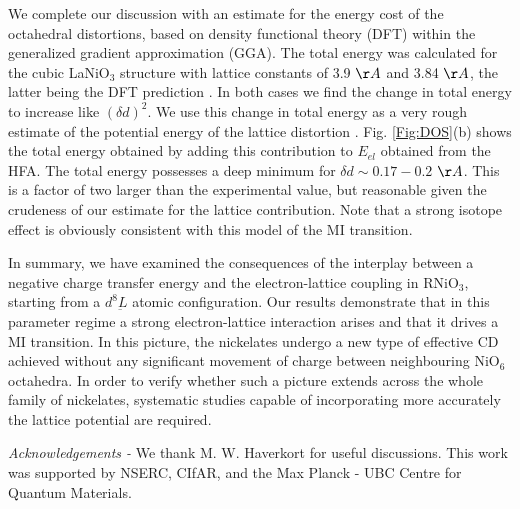 \documentclass[showpacs,preprintnumbers,amsmath,amssymb,prl,aps,twocolumn,superscriptaddress]{revtex4}
\newcommand{\ligand}{{\underbar L}}
\begin{document}
We complete our discussion with an estimate for the energy cost of the
octahedral distortions, based on density functional theory (DFT)
within the generalized gradient approximation (GGA)\cite{gga_PBE,wien2k}. The
total energy was calculated for the cubic LaNiO$_3$ structure with
lattice constants of 3.9 $\AA$ and 3.84 $\AA$, the latter being the
DFT prediction \cite{DFT_details}. In both cases we find the change in
total energy to increase like $(\delta d)^2$.  We use this change in
total energy as a very rough estimate of the potential energy
of the lattice distortion \cite{Footnote}.
Fig. \ref{Fig:DOS}(b) shows the total energy obtained by adding this
contribution to $E_{el}$ obtained from the HFA. The total energy
possesses a deep minimum for $\delta d \sim 0.17-0.2$ $\AA$.  This is
a factor of two larger than the experimental value, but reasonable
given the crudeness of our estimate for the lattice contribution. 
Note that a strong isotope effect is obviously consistent with 
this model of the MI transition.


In summary, we have examined the consequences of the interplay between
a negative charge transfer energy and the electron-lattice coupling in
RNiO$_3$, starting from a $d^8\ligand$ atomic configuration.  Our results
demonstrate that in this 
parameter regime a strong electron-lattice interaction arises and that
it drives a MI transition.  In this picture, the nickelates 
undergo a new type of effective CD achieved without any significant movement
of charge between neighbouring NiO$_6$ octahedra.  In order to verify
whether such a picture extends across the whole family of nickelates,
systematic studies capable of incorporating  more
accurately the lattice potential are required.

{\it Acknowledgements - } 
We thank M. W. Haverkort for useful discussions. This work was 
supported by NSERC, CIfAR, and the Max Planck - UBC Centre for Quantum Materials.
\end{document}
